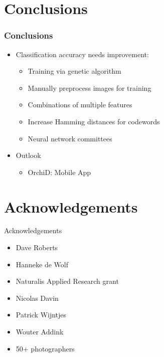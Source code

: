 \documentclass[]{beamer}
\begin{document}
\section{Conclusions}

    \begin{frame}
        \frametitle{Conclusions}

        \begin{itemize}
            \item Classification accuracy needs improvement:
            \begin{itemize}
                \item Training via genetic algorithm
                \item Manually preprocess images for training
                \item Combinations of multiple features
                \item Increase Hamming distances for codewords
                \item Neural network committees
            \end{itemize}
        \end{itemize}

        \begin{itemize}
            \item Outlook
            \begin{itemize}
                \item OrchiD: Mobile App
            \end{itemize}
        \end{itemize}
    \end{frame}


\section*{Acknowledgements}

    \begin{frame}{Acknowledgements}
        \begin{itemize}
            \item Dave Roberts
            \item Hanneke de Wolf
            \item Naturalis Applied Research grant
            \item Nicolas Davin
            \item Patrick Wijntjes
            \item Wouter Addink
            \item 50+ photographers
        \end{itemize}
    \end{frame}
\end{document}
